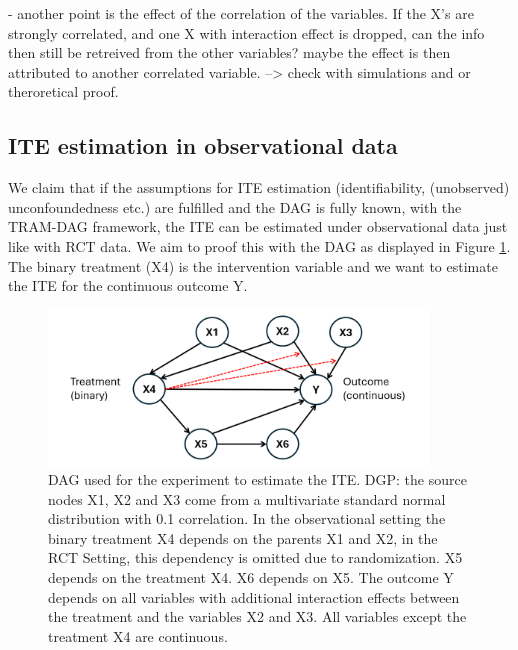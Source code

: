 - another point is the effect of the correlation of the variables. If the X's are strongly correlated, and one X with interaction effect is dropped, can the info then still be retreived from the other variables? maybe the effect is then attributed to another correlated variable. --> check with simulations and or theroretical proof.




\subsection{ITE estimation in observational data}

We claim that if the assumptions for ITE estimation (identifiability, (unobserved) unconfoundedness etc.) are fulfilled and the DAG is fully known, with the TRAM-DAG framework, the ITE can be estimated under observational data just like with RCT data. We aim to proof this with the DAG as displayed in Figure \ref{fig:ite_dag_observational}. The binary treatment (X4) is the intervention variable and we want to estimate the ITE for the continuous outcome Y. 


\begin{figure}[H]
\centering
\includegraphics[width=0.9\textwidth]{img/dag_ITE_observational.png}
\caption{DAG used for the experiment to estimate the ITE. DGP: the source nodes X1, X2 and X3 come from a multivariate standard normal distribution with 0.1 correlation. In the observational setting the binary treatment X4 depends on the parents X1 and X2, in the RCT Setting, this dependency is omitted due to randomization. X5 depends on the treatment X4. X6 depends on X5. The outcome Y depends on all variables with additional interaction effects between the treatment and the variables X2 and X3. All variables except the treatment X4 are continuous.}
\label{fig:ite_dag_observational}
\end{figure}

